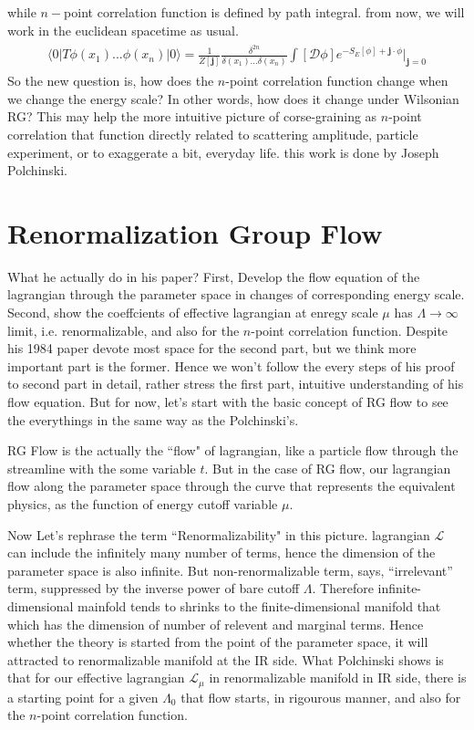 \documentclass[12pt,halfline,a4paper]{ouparticle}
\begin{document}
while $n-$point correlation function is defined by path integral. from now, we will work in the euclidean spacetime as usual.
\begin{align}\begin{split}
\label{correlation}
\langle 0|T\phi(x_1)...\phi(x_n)|0\rangle = \frac{1}{Z[\mathbf{j}]}\frac{\delta^{2n}}{\delta(x_1)...\delta(x_n)}\int [\mathcal{D}\phi] e^{-S_E[\phi]+\mathbf{j}\cdot\phi}\bigg\rvert_{\mathbf{j}=0}
\end{split}\end{align}
So the new question is, how does the $n$-point correlation function change when we change the energy scale? In other words, how does it change under Wilsonian RG?
This may help the more intuitive picture of corse-graining as $n$-point correlation that function directly related to scattering amplitude, particle experiment, or to exaggerate a bit, everyday life. this work is done by Joseph Polchinski. 

\section{Renormalization Group Flow}
\label{sec2}

What he actually do in his paper?
First, Develop the flow equation of the lagrangian through the parameter space in changes of corresponding energy scale.
Second, show the coeffcients of effective lagrangian at enregy scale $\mu$ has $\Lambda\rightarrow \infty$ limit, i.e. renormalizable, and also for the $n$-point correlation function.
Despite his 1984 paper devote most space for the second part, but we think more important part is the former. 
Hence we won't follow the every steps of his proof to second part in detail, rather stress the first part, intuitive understanding of his flow equation.
But for now, let's start with the basic concept of RG flow to see the everythings in the same way as the Polchinski's.

RG Flow is the actually the ``flow" of lagrangian, like a particle flow through the streamline with the some variable $t$.
But in the case of RG flow, our lagrangian flow along the parameter space through the curve that represents the equivalent physics,
as the function of energy cutoff variable $\mu$.

Now Let's rephrase the term ``Renormalizability" in this picture. lagrangian $\mathcal L$ can include the infinitely many number of terms, hence the dimension of the parameter space is also infinite.
But non-renormalizable term, says, ``irrelevant'' term, suppressed by the inverse power of bare cutoff $\Lambda$.
Therefore infinite-dimensional mainfold tends to shrinks to the finite-dimensional manifold that which has the dimension of number of relevent and marginal terms.
Hence whether the theory is started from the point of the parameter space, it will attracted to renormalizable manifold at the IR side. What Polchinski shows is that for our effective lagrangian $\mathcal{L}_\mu$ in renormalizable manifold in IR side,
there is a starting point for a given $\Lambda_0$ that flow starts, in rigourous manner, and also for the $n$-point correlation function.
\end{document}
